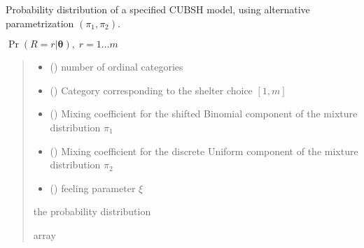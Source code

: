 \documentclass[letterpaper,10pt,english]{sphinxmanual}
\begin{document}
\begin{fulllineitems}
\label{\detokenize{cubmods:cubmods.cubsh.pmf}}
\pysigstartsignatures
{}
\pysigstopsignatures
\sphinxAtStartPar
Probability distribution of a specified CUBSH model,
using alternative parametrization \((\pi_1, \pi_2)\).

\sphinxAtStartPar
\(\Pr(R = r | \pmb\theta),\; r=1 \ldots m\)
\begin{quote}\begin{description}
\begin{itemize}
\item {} 
\sphinxAtStartPar
{} () \textendash{} number of ordinal categories

\item {} 
\sphinxAtStartPar
{} () \textendash{} Category corresponding to the shelter choice \([1,m]\)

\item {} 
\sphinxAtStartPar
{} () \textendash{} Mixing coefficient for the shifted Binomial component of the mixture distribution \(\pi_1\)

\item {} 
\sphinxAtStartPar
{} () \textendash{} Mixing coefficient for the discrete Uniform component of the mixture distribution \(\pi_2\)

\item {} 
\sphinxAtStartPar
{} () \textendash{} feeling parameter \(\xi\)

\end{itemize}

\sphinxAtStartPar
the probability distribution

\sphinxAtStartPar
array

\end{description}\end{quote}

\end{fulllineitems}
\end{document}
